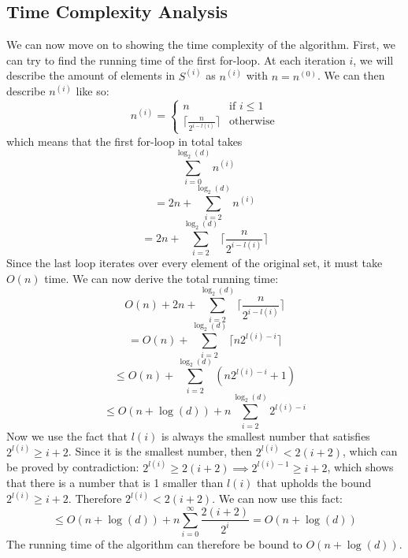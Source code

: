 \subsection{Time Complexity Analysis}
We can now move on to showing the time complexity of the algorithm. 
First, we can try to find the running time of the first for-loop. At each iteration $i$, we will describe the amount of elements in $S^{(i)}$ as $n^{(i)}$ with $n=n^{(0)}$. We can then describe $n^{(i)}$ like so:
\begin{equation}
    n^{(i)}=
    \begin{cases}
        n & \textrm{if } i \leq 1  \\
        \lceil \frac{n}{2^{i-l(i)}} \rceil & \textrm{otherwise}
    \end{cases}
\end{equation}
which means that the first for-loop in total takes
$$\sum_{i=0}^{\log_2{(d)}}n^{(i)}$$
$$=2n+\sum_{i=2}^{\log_2{(d)}} n^{(i)}$$
$$=2n + \sum_{i=2}^{\log_2(d)}\lceil \frac{n}{2^{i-l(i)}} \rceil$$
Since the last loop iterates over every element of the original set, it must take $O(n)$ time. We can now derive the total running time:
$$O(n) + 2n + \sum_{i=2}^{\log_2(d)}\lceil \frac{n}{2^{i-l(i)}} \rceil$$
$$=O(n) + \sum_{i=2}^{\log_2(d)}\lceil n2^{l(i)-i} \rceil$$
$$\leq O(n) + \sum_{i=2}^{\log_2(d)}(n 2^{l(i)-i} + 1)$$
$$\leq O(n + \log(d)) + n\sum_{i=2}^{\log_2(d)}2^{l(i)-i}$$
Now we use the fact that $l(i)$ is always the smallest number that satisfies $2^{l(i)} \geq i + 2$. Since it is the smallest number, then $2^{l(i)} < 2(i+2)$, which can be proved by contradiction: $2^{l(i)} \geq 2(i+2) \implies 2^{l(i)-1} \geq i+2$, which shows that there is a number that is 1 smaller than $l(i)$ that upholds the bound $2^{l(i)} \geq i + 2$. Therefore $2^{l(i)} < 2(i+2)$. We can now use this fact:
$$\leq O(n + \log(d)) + n\sum_{i=0}^{\infty}\frac{2(i+2)}{2^{i}} = O(n+\log(d))$$
The running time of the algorithm can therefore be bound to $O(n + \log(d))$.
